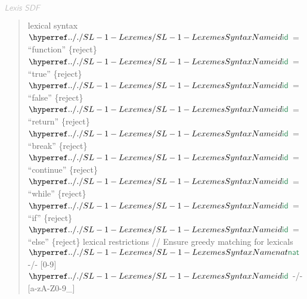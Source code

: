 $\KEY{Lexis SDF}$

\begin{quote}
lexical syntax\newline
   $\SHADE{\SYNHYPER{../.}{SL-1-Lexemes}{id}}$ = ``function'' \{reject\}\newline
   $\SHADE{\SYNHYPER{../.}{SL-1-Lexemes}{id}}$ = ``true''     \{reject\}\newline
   $\SHADE{\SYNHYPER{../.}{SL-1-Lexemes}{id}}$ = ``false''    \{reject\}\newline
   $\SHADE{\SYNHYPER{../.}{SL-1-Lexemes}{id}}$ = ``return''   \{reject\}\newline
   $\SHADE{\SYNHYPER{../.}{SL-1-Lexemes}{id}}$ = ``break''    \{reject\}\newline
   $\SHADE{\SYNHYPER{../.}{SL-1-Lexemes}{id}}$ = ``continue'' \{reject\}\newline
   $\SHADE{\SYNHYPER{../.}{SL-1-Lexemes}{id}}$ = ``while''    \{reject\}\newline
   $\SHADE{\SYNHYPER{../.}{SL-1-Lexemes}{id}}$ = ``if''       \{reject\}\newline
   $\SHADE{\SYNHYPER{../.}{SL-1-Lexemes}{id}}$ = ``else''     \{reject\}\newline
   \newline
   lexical restrictions\newline
   // Ensure greedy matching for lexicals\newline
   $\SHADE{\SYNHYPER{../.}{SL-1-Lexemes}{nat}}$ -/- {[}0-9{]}\newline
   $\SHADE{\SYNHYPER{../.}{SL-1-Lexemes}{id}}$  -/- {[}a-zA-Z0-9\_{]}
\end{quote}



